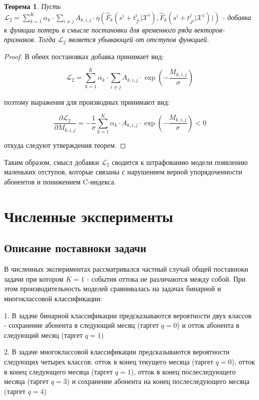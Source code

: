 \documentclass{article}
\newtheorem{theorem}{Теорема}
\begin{document}
\begin{theorem}
	Пусть $\mathcal{L}_2 =\sum_{k=1}^K\alpha_k\cdot\sum_{i\neq j}A_{k,i,j}\cdot\eta\left(\hat{F}_k(s^i+t_{J^i}^i|\mathcal{X}^i) , \hat{F}_k(s^i+t_{J^j}^j|\mathcal{X}^j))\right)$ - добавка к функции потерь в смысле постановки для временного ряда векторов-признаков. Тогда $\mathcal{L}_2$ является убывающей от отступов функцией.  
\end{theorem}

\begin{proof}
	В обеих постановках добавка принимает вид: 
	
	$$\mathcal{L}_2 =\sum_{k=1}^K\alpha_k\cdot\sum_{i\neq j}A_{k,i,j}\cdot\exp\left(-\frac{M_{k,i,j}}{\sigma}\right)$$
	
	поэтому выражения для производных принимают вид: 
	
	$$ 
	\frac{\partial \mathcal{L}_2}{\partial M_{k,i,j}} = 
	-\frac{1}{\sigma} \sum_{k=1}^K\alpha_k\cdot A_{k,i,j}\cdot\exp\left(-\frac{M_{k,i,j}}{\sigma}\right) < 0
	 $$
	
	откуда следуют утверждения теорем.
\end{proof}


Таким образом, смысл добавки $\mathcal{L}_2$ сводится к штрафованию модели появлению маленьких отступов, которые связаны с нарушением верной упорядоченности абонентов и понижением C-индекса. 


\section{Численные эксперименты}

\subsection{Описание поставноки задачи}

В численных экспериментах рассматривался частный случай общей поставноки задачи при котором $K = 1$ - события оттока не различаются между собой. При этом производительность моделей сравнивалась на задачах бинарной и многоклассовой классификации: 

1. В задаче бинарной классификации предсказываются вероятности двух классов - сохранение абонента в следующий месяц (таргет $q = 0$) и отток абонента в следующий месяц (таргет $q = 1$)

2. В задаче многоклассовой классификации предсказываются вероятности следующих четырех классов: отток в конец текущего месяца (таргет $q = 0$), отток в конец следующего месяца (таргет $q = 1$), отток в конец послеследующего месяца (таргет $q = 3$) и сохранение абонента на конец послеследующего месяца (таргет $q = 4$)
\end{document}
